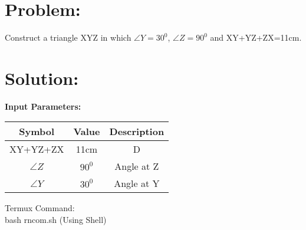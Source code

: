 \documentclass[10pt,a4paper]{report}
\begin{document}
\begin{multicols}{2}

\section{Problem:}  
Construct a triangle XYZ in which $\angle{Y}=30^0$, $\angle{Z}=90^0$ and  XY+YZ+ZX=11cm.\vspace{2mm}

\section{Solution: }
\raggedright \textbf{Input Parameters:}\\
\vspace{1mm}
\begin{center}
\begin{tabular}{|c|c|c|}
	\hline
	\textbf{Symbol}&\textbf{Value}&\textbf{Description}\\
	\hline
	XY+YZ+ZX & 11cm & D\\
	\hline 
	$\angle{Z}$ & $90^0$ & Angle at Z \\
	\hline
	$\angle{Y}$ & $30^0$ & Angle at Y \\
	\hline
	
\end{tabular}
\end{center}
\vspace{3mm}



\raggedright Termux Command:\\
               \centering bash rncom.sh (Using Shell)\\
               \vspace{3mm} 


\end{multicols}
\end{document}
